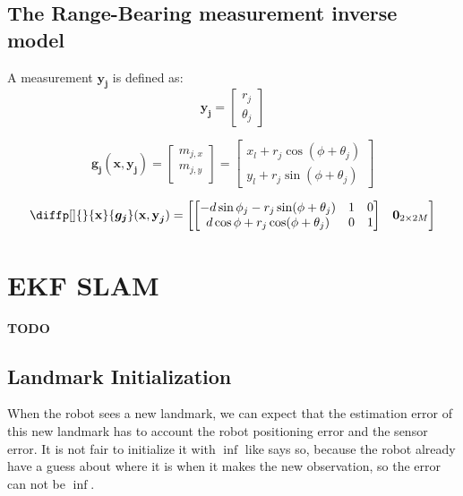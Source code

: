 \documentclass[12pt]{article}
\newcommand{\bvec}[1]{\boldsymbol{\mathbf{#1}}} %
\newcommand{\mat}[1]{\boldsymbol{\mathbf{#1}}}
\newcommand{\mb}[1]{{\boldsymbol{#1}}} %
\newcommand{\matnull}[2]{\mat{0}_{#1\times#2}} %
\newcommand{\blue}[1]{\color{blue}#1\color{black}}
\begin{document}
\subsection{The Range-Bearing measurement inverse model}
A measurement $\bvec{y}_\mb{j}$ is defined as:
\begin{equation}
    \bvec{y}_\mb{j} = \begin{bmatrix}
        r_j \\ 
        \theta_j \end{bmatrix}
\end{equation}

\begin{equation}
    \mb{g_j}(\bvec{x}, \bvec{y}_\mb{j}) = 
    \begin{bmatrix}
        m_{j, x} \\
        m_{j, y} \\
    \end{bmatrix} =
    \begin{bmatrix}
        x_l + r_j \cos(\phi + \theta_j)\\
        y_l + r_j \sin(\phi + \theta_j) 
    \end{bmatrix}
    \label{eq:measurement-inverse-model}
\end{equation}

\begin{equation}
    \diffp[]{}{\bvec{x}} \mb{g_j}(\bvec{x}, \bvec{y}_\mb{j}) = \begin{bmatrix}\begin{bmatrix}
        -d \sin{\phi_j} - r_j \sin(\phi + \theta_j)  & 1 & 0\\
        d\cos{\phi} + r_j\cos(\phi + \theta_j) & 0 & 1
    \end{bmatrix} & \matnull{2}{2M}\end{bmatrix}
\end{equation}

\section{EKF SLAM}
\blue{\textbf{TODO}}

\subsection{Landmark Initialization}
When the robot sees a new landmark, we can expect that the estimation error of this new landmark has to account the robot positioning error and the sensor error. It is not fair to initialize it with $\inf$ like \cite[p.~ ]{bongard2006probabilistic} says so, because the robot already have a guess about where it is when it makes the new observation, so the error can not be $\inf$.
\end{document}
